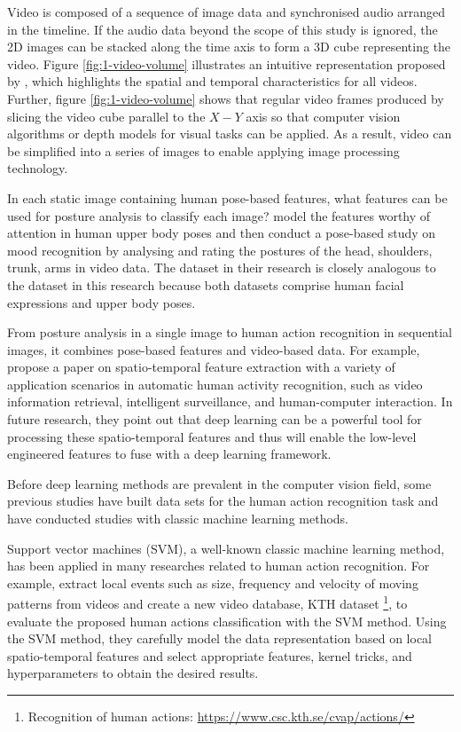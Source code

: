 Video is composed of a sequence of image data and synchronised audio arranged in the timeline. 
If the audio data beyond the scope of this study is ignored, the 2D images can be stacked along the time axis to form a 3D cube representing the video. Figure \ref{fig:1-video-volume} illustrates an intuitive representation proposed by \citet{fels1999interactive}, which highlights the spatial and temporal characteristics for all videos.
Further, figure \ref{fig:1-video-volume} shows that regular video frames produced by slicing the video cube parallel to the $X-Y$ axis so that computer vision algorithms or depth models for visual tasks can be applied.
As a result, video can be simplified into a series of images to enable applying image processing technology.

In each static image containing human pose-based features, what features can be used for posture analysis to classify each image? 
\citet{thrasher2011mood} model the features worthy of attention in human upper body poses and then conduct a pose-based study on mood recognition by analysing and rating the postures of the head, shoulders, trunk, arms in video data.
The dataset in their research is closely analogous to the dataset in this research because both datasets comprise human facial expressions and upper body poses.

From posture analysis in a single image to human action recognition in sequential images, it combines pose-based features and video-based data.
For example, \citet{yao2016spatio} propose a paper on spatio-temporal feature extraction with a variety of application scenarios in automatic human activity recognition, such as video information retrieval, intelligent surveillance, and human-computer interaction.
In future research, they point out that deep learning can be a powerful tool for processing these spatio-temporal features and thus will enable the low-level engineered features to fuse with a deep learning framework.

Before deep learning methods are prevalent in the computer vision field, some previous studies have built data sets for the human action recognition task and have conducted studies with classic machine learning methods.

Support vector machines (SVM), a well-known classic machine learning method, has been applied in many researches related to human action recognition.
For example, \citet{schuldt2004recognizing} extract local events such as size, frequency and velocity of moving patterns from videos and create a new video database, KTH dataset \footnote{Recognition of human actions: \url{https://www.csc.kth.se/cvap/actions/}}, to evaluate the proposed human actions classification with the SVM method.
Using the SVM method, they carefully model the data representation based on local spatio-temporal features and select appropriate features, kernel tricks, and hyperparameters to obtain the desired results.

